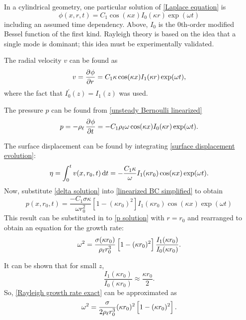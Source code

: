 In a cylindrical geometry, one particular solution of \eqref{Laplace equation} is
\begin{equation}
   \phi(x, r, t) = C_1 \cos(\kappa x) I_0(\kappa r) \exp(\omega t)
\end{equation}
including an assumed time dependency. Above, $I_0$ is the $0$th-order modified Bessel function of the first kind. Rayleigh theory is based on the idea that a single mode is dominant; this idea must be experimentally validated.

The radial velocity $v$ can be found as
\begin{equation}
   v = \dpd{\phi}{r} = C_1 \kappa \cos(\kappa x) I_1(\kappa r) \exp(\omega t),
\end{equation}
where the fact that $I_0^\prime(z) = I_1(z)$ was used.

The pressure $p$ can be found from \eqref{unsteady Bernoulli linearized}
\begin{equation}
   p = -\rhol \dpd{\phi}{t} = -C_1 \rhol \omega \cos(\kappa x) I_0(\kappa r) \exp(\omega t). \label{eqn:p solution}
\end{equation}

The surface displacement can be found by integrating \eqref{surface displacement evolution}:
\begin{equation}
   \eta = \int_0^t v(x, r_0, t) \dif t = -\frac{C_1 \kappa}{\omega} I_1(\kappa r_0) \cos(\kappa x) \exp(\omega t). \label{eqn:delta solution}
\end{equation}
Now, substitute \eqref{delta solution} into \eqref{linearized BC simplified} to obtain
\begin{equation}
   p(x, r_0, t) = \frac{-C_1 \sigma \kappa}{\omega r_0^2} \left[1 - (\kappa r_0)^2\right] I_1(\kappa r_0) \cos(\kappa x) \exp(\omega t)
\end{equation}
This result can be substituted in to \eqref{p solution} with $r = r_0$ and rearranged to obtain an equation for the growth rate:
\begin{equation}
   \omega^2 = \frac{\sigma (\kappa r_0)}{\rho_{\ell} r_0^3} \left[1 - (\kappa r_0)^2\right] \frac{I_1(\kappa r_0)}{I_0(\kappa r_0)}. \label{eqn:Rayleigh growth rate exact}
\end{equation}

It can be shown that for small $z$,
\begin{equation}
   \frac{I_1(\kappa r_0)}{I_0(\kappa r_0)} \approx \frac{\kappa r_0}{2}.
\end{equation}
So, \eqref{Rayleigh growth rate exact} can be approximated as
\begin{equation}
   \omega^2 = \frac{\sigma}{2 \rho_{\ell} r_0^3} (\kappa r_0)^2 \left[1 - (\kappa r_0)^2\right]. \label{eqn:Rayleigh growth rate approx}
\end{equation}

